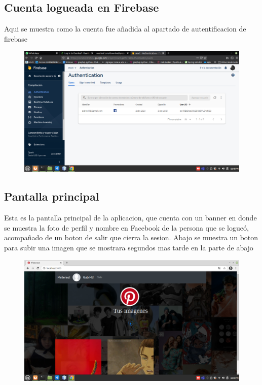 \documentclass[60pt]{article}
\begin{document}
\subsection{Cuenta logueada en Firebase}
Aqui se muestra como la cuenta fue añadida al apartado de autentificacion de firebase
\begin{figure}[htb]
\centering
\includegraphics[width=1\linewidth]{autenticacion.png}
\end{figure}

\subsection{Pantalla principal}
Esta es la pantalla principal de la aplicacion, que cuenta con un banner en donde se muestra la foto de perfil y nombre en Facebook de la persona que se logueó, acompañado de un boton de salir que cierra la sesion. Abajo se muestra un boton para subir una imagen que se mostrara segundos mas tarde en la parte de abajo
\begin{figure}[htb]
\centering
\includegraphics[width=.94\linewidth]{principal.png}
\end{figure}
\end{document}
